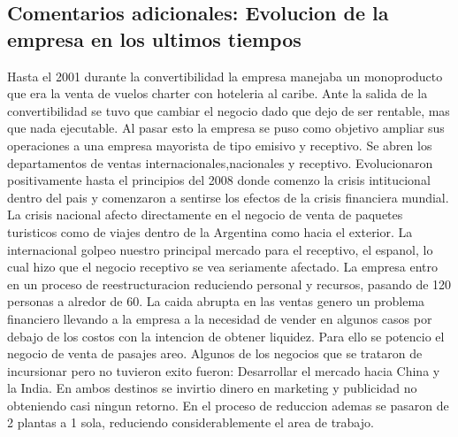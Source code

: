 \documentclass[12pt,a4paper,spanish]{article}
\begin{document}
\subsection{Comentarios adicionales: Evolucion de la empresa en los ultimos tiempos}
Hasta el 2001 durante la convertibilidad la empresa manejaba un monoproducto que era la venta de vuelos charter con hoteleria al caribe.
Ante la salida de la convertibilidad se tuvo que cambiar el negocio dado que dejo de ser rentable, mas que nada ejecutable.
Al pasar esto la empresa se puso como objetivo ampliar sus operaciones a una empresa mayorista de tipo emisivo y receptivo.
Se abren los departamentos de ventas internacionales,nacionales y receptivo.
Evolucionaron positivamente hasta el principios del 2008 donde comenzo la crisis intitucional dentro del pais y comenzaron a sentirse los efectos de la crisis financiera mundial.
La crisis nacional afecto directamente en el negocio de venta de paquetes turisticos como de viajes dentro de la Argentina como hacia el exterior.
La internacional golpeo nuestro principal mercado para el receptivo, el espanol, lo cual hizo que el negocio receptivo se vea seriamente afectado.
La empresa entro en un proceso de reestructuracion reduciendo personal y recursos, pasando de 120 personas a alredor de 60.
La caida abrupta en las ventas genero un problema financiero llevando a la empresa a la necesidad de vender en algunos casos por debajo de los costos con la intencion de obtener liquidez. Para ello se potencio el negocio de venta de pasajes areo.
Algunos de los negocios que se trataron de incursionar pero no tuvieron exito fueron:
Desarrollar el mercado hacia China y la India.
En ambos destinos se invirtio dinero en marketing y publicidad no obteniendo casi ningun retorno.
En el proceso de reduccion ademas se pasaron de 2 plantas a 1 sola, reduciendo considerablemente el area de trabajo.
\end{document}

